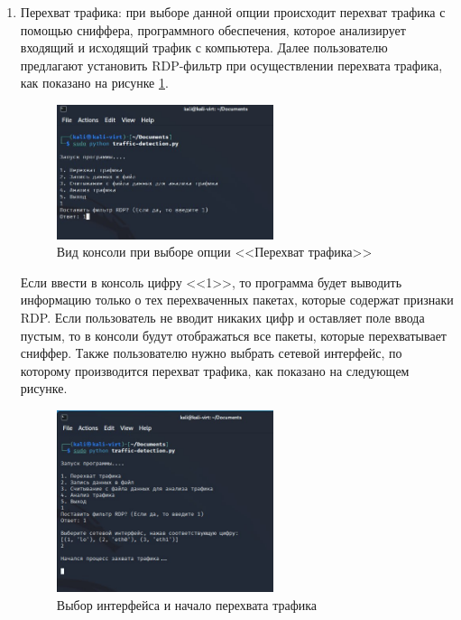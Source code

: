 \documentclass[bachelor, och, coursework]{SCWorks}
\begin{document}
\begin{enumerate}
  \item Перехват трафика: при выборе данной опции происходит перехват трафика с помощью сниффера, программного обеспечения, которое анализирует входящий
  и исходящий трафик с компьютера. Далее пользователю предлагают установить RDP-фильтр при осуществлении перехвата трафика, как показано на рисунке 
  \ref{cmd-filter}.
  
  \begin{figure}[H]
    \centering
    \includegraphics[width=0.6\textwidth]{photo/cmd-filter.jpg}
    \caption{Вид консоли при выборе опции <<Перехват трафика>>}
    \label{cmd-filter}
  \end{figure}

  Если ввести в консоль цифру <<1>>, то программа будет выводить информацию только о тех перехваченных пакетах, которые содержат признаки RDP. 
  Если пользователь не вводит никаких цифр и оставляет поле ввода пустым, то в консоли будут отображаться все пакеты, которые перехватывает сниффер.
  Также пользователю нужно выбрать сетевой интерфейс, по которому производится перехват трафика, как показано на следующем рисунке.


  \begin{figure}[H]
    \centering
    \includegraphics[width=0.6\textwidth]{photo/cmd-start.jpg}
    \caption{Выбор интерфейса и начало перехвата трафика}
    \label{cmd-start}
  \end{figure}



\end{enumerate}
\end{document}
